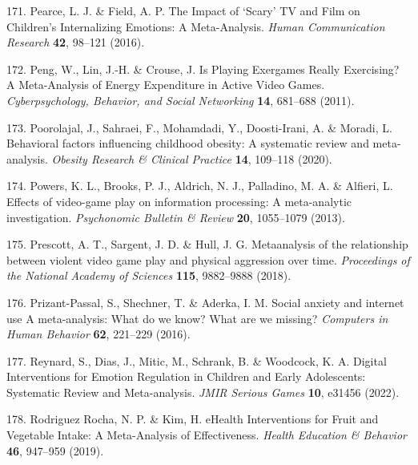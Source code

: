 \documentclass[
  english,
  man]{apa6}
\newenvironment{cslreferences}%
  {}%
  {\par}
\begin{document}
\begin{cslreferences}
\leavevmode\hypertarget{ref-pearceImpactScaryTV2016}{}%
171. Pearce, L. J. \& Field, A. P. The Impact of `Scary' TV and Film on Children's Internalizing Emotions: A Meta-Analysis. \emph{Human Communication Research} \textbf{42}, 98--121 (2016).

\leavevmode\hypertarget{ref-pengPlayingExergamesReally2011}{}%
172. Peng, W., Lin, J.-H. \& Crouse, J. Is Playing Exergames Really Exercising? A Meta-Analysis of Energy Expenditure in Active Video Games. \emph{Cyberpsychology, Behavior, and Social Networking} \textbf{14}, 681--688 (2011).

\leavevmode\hypertarget{ref-poorolajalBehavioralFactorsInfluencing2020}{}%
173. Poorolajal, J., Sahraei, F., Mohamdadi, Y., Doosti-Irani, A. \& Moradi, L. Behavioral factors influencing childhood obesity: A systematic review and meta-analysis. \emph{Obesity Research \& Clinical Practice} \textbf{14}, 109--118 (2020).

\leavevmode\hypertarget{ref-powersEffectsVideogamePlay2013}{}%
174. Powers, K. L., Brooks, P. J., Aldrich, N. J., Palladino, M. A. \& Alfieri, L. Effects of video-game play on information processing: A meta-analytic investigation. \emph{Psychonomic Bulletin \& Review} \textbf{20}, 1055--1079 (2013).

\leavevmode\hypertarget{ref-prescottMetaanalysisRelationshipViolent2018}{}%
175. Prescott, A. T., Sargent, J. D. \& Hull, J. G. Metaanalysis of the relationship between violent video game play and physical aggression over time. \emph{Proceedings of the National Academy of Sciences} \textbf{115}, 9882--9888 (2018).

\leavevmode\hypertarget{ref-prizant-passalSocialAnxietyInternet2016}{}%
176. Prizant-Passal, S., Shechner, T. \& Aderka, I. M. Social anxiety and internet use A meta-analysis: What do we know? What are we missing? \emph{Computers in Human Behavior} \textbf{62}, 221--229 (2016).

\leavevmode\hypertarget{ref-reynardDigitalInterventionsEmotion2022}{}%
177. Reynard, S., Dias, J., Mitic, M., Schrank, B. \& Woodcock, K. A. Digital Interventions for Emotion Regulation in Children and Early Adolescents: Systematic Review and Meta-analysis. \emph{JMIR Serious Games} \textbf{10}, e31456 (2022).

\leavevmode\hypertarget{ref-rodriguezrochaEHealthInterventionsFruit2019}{}%
178. Rodriguez Rocha, N. P. \& Kim, H. eHealth Interventions for Fruit and Vegetable Intake: A Meta-Analysis of Effectiveness. \emph{Health Education \& Behavior} \textbf{46}, 947--959 (2019).


\end{cslreferences}
\end{document}
